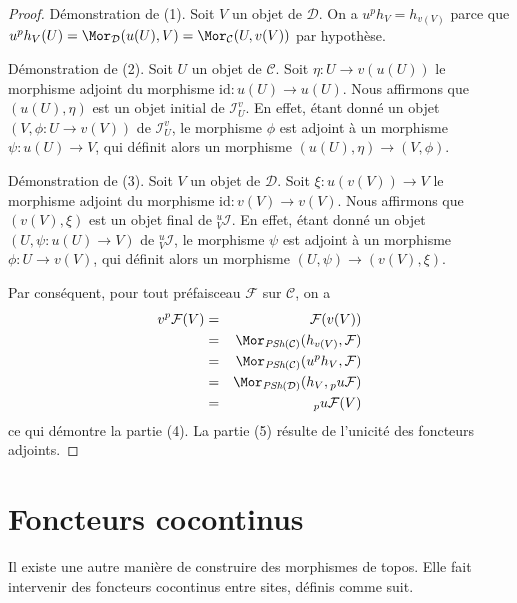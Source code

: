 \begin{proof}
Démonstration de (1). Soit $V$ un objet de $\mathcal{D}$. On a
$u^ph_V = h_{v(V)}$ parce que
$u^ph_V(U) = \Mor_\mathcal{D}(u(U), V) = \Mor_\mathcal{C}(U, v(V))$
par hypothèse.

\medskip\noindent
Démonstration de (2). Soit $U$ un objet de $\mathcal{C}$. Soit
$\eta : U \to v(u(U))$ le morphisme adjoint du morphisme
$\text{id} : u(U) \to u(U)$. Nous affirmons que $(u(U), \eta)$
est un objet initial de $\mathcal{I}_U^v$. En effet, étant donné
un objet $(V, \phi : U \to v(V))$ de $\mathcal{I}_U^v$,
le morphisme $\phi$ est adjoint à un morphisme $\psi : u(U) \to V$,
qui définit alors un morphisme $(u(U), \eta) \to (V, \phi)$.

\medskip\noindent
Démonstration de (3). Soit $V$ un objet de $\mathcal{D}$. Soit
$\xi : u(v(V)) \to V$ le morphisme adjoint du morphisme
$\text{id} : v(V) \to v(V)$. Nous affirmons que $(v(V), \xi)$
est un objet final de ${}_V^u\mathcal{I}$. En effet, étant donné
un objet $(U, \psi : u(U) \to V)$ de ${}_V^u\mathcal{I}$,
le morphisme $\psi$ est adjoint à un morphisme $\phi : U \to v(V)$,
qui définit alors un morphisme $(U, \psi) \to (v(V), \xi)$.

\medskip\noindent
Par conséquent, pour tout préfaisceau $\mathcal{F}$ sur $\mathcal{C}$,
on a
\begin{eqnarray*}
v^p\mathcal{F}(V)
& = &
\mathcal{F}(v(V)) \\
& = &
\Mor_{\textit{PSh}(\mathcal{C})}(h_{v(V)}, \mathcal{F}) \\
& = &
\Mor_{\textit{PSh}(\mathcal{C})}(u^ph_V, \mathcal{F}) \\
& = &
\Mor_{\textit{PSh}(\mathcal{D})}(h_V, {}_pu\mathcal{F}) \\
& = &
{}_pu\mathcal{F}(V)
\end{eqnarray*}
ce qui démontre la partie (4). La partie (5) résulte de l’unicité
des foncteurs adjoints.
\end{proof}





\section{Foncteurs cocontinus}
\label{section-cocontinuous-functors}

\noindent
Il existe une autre manière de construire des morphismes de topos.
Elle fait intervenir des foncteurs cocontinus entre sites, définis comme suit.

